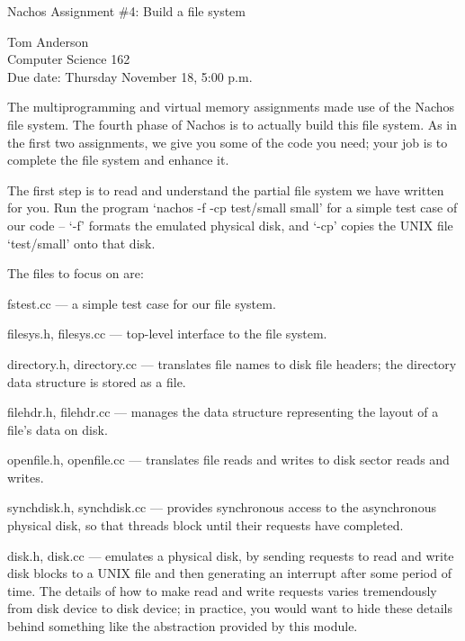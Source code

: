 


\begin{center}
{\large Nachos Assignment \#4: Build a file system

\vspace{.2in}
Tom Anderson\\
Computer Science 162\\
Due date: Thursday November 18, 5:00 p.m.}
\end{center}

\vspace{.2in}

The multiprogramming and virtual memory assignments made use
of the Nachos file system.
The fourth phase of Nachos is to actually build this file system.
As in the first two assignments, we give you some of the code
you need; your job is to complete the file system and enhance it.

The first step is to read and understand the partial file system
we have written for you.
Run the program `nachos -f -cp test/small small' for a simple test case
of our code -- `-f' formats the emulated physical disk, and `-cp'
copies the UNIX file `test/small' onto that disk.

The files to focus on are:

\begin{description}

\item fstest.cc --- a simple test case for our file system.

\item filesys.h, filesys.cc --- top-level interface to the file system.

\item directory.h, directory.cc --- translates file names to disk file
headers; the directory data structure is stored as a file.

\item filehdr.h, filehdr.cc --- manages the data structure representing
the layout of a file's data on disk.

\item openfile.h, openfile.cc --- translates file reads and writes to
disk sector reads and writes.

\item synchdisk.h, synchdisk.cc --- provides synchronous
access to the asynchronous physical disk, so that threads block until
their requests have completed.

\item disk.h, disk.cc --- emulates a physical disk, by sending requests
to read and write disk blocks to a UNIX file and then generating an interrupt
after some period of time.
The details of how to make read and write requests varies tremendously
from disk device to disk device; in practice, you would want to hide
these details behind something like the abstraction provided by this module.

\end{description}

